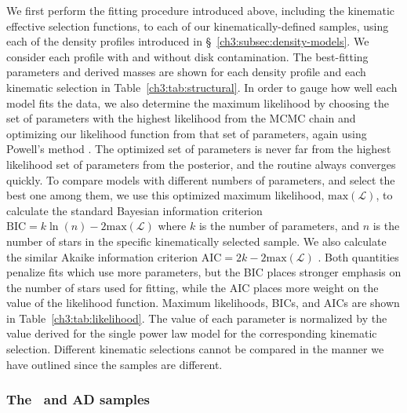 We first perform the fitting procedure introduced above, including the kinematic effective selection functions, to each of our kinematically-defined \gse samples, using each of the density profiles introduced in \S~\ref{ch3:subsec:density-models}. We consider each profile with and without disk contamination. The best-fitting parameters and derived masses are shown for each density profile and each kinematic selection in Table~\ref{ch3:tab:structural}. In order to gauge how well each model fits the data, we also determine the maximum likelihood by choosing the set of parameters with the highest likelihood from the MCMC chain and optimizing our likelihood function from that set of parameters, again using Powell's method \parencite{powell64}. The optimized set of parameters is never far from the highest likelihood set of parameters from the posterior, and the routine always converges quickly. To compare models with different numbers of parameters, and select the best one among them, we use this optimized maximum likelihood, $\mathrm{max}(\mathcal{L})$, to calculate the standard Bayesian information criterion $\mathrm{BIC} = k\ln(n) - 2\mathrm{max}(\mathcal{L})$ \parencite{schwarz78} where $k$ is the number of parameters, and $n$ is the number of stars in the specific kinematically selected sample. We also calculate the similar Akaike information criterion $\mathrm{AIC} = 2k - 2\mathrm{max}(\mathcal{L})$ \parencite{akaike74}. Both quantities penalize fits which use more parameters, but the BIC places stronger emphasis on the number of stars used for fitting, while the AIC places more weight on the value of the likelihood function. Maximum likelihoods, BICs, and AICs are shown in Table~\ref{ch3:tab:likelihood}. The value of each parameter is normalized by the value derived for the single power law model for the corresponding kinematic selection. Different kinematic selections cannot be compared in the manner we have outlined since the samples are different.



\subsubsection{The \eLz\ and AD samples}
\label{ch3:subsubsec:eLz-and-AD-samples}

